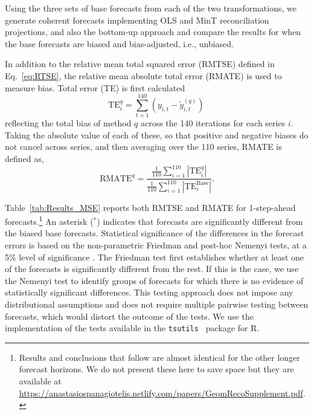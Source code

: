 \documentclass[12pt]{article}
\theoremstyle{definition}
\begin{document}
Using the three sets of base forecasts from each of the two transformations, we generate coherent forecasts implementing OLS and MinT reconciliation projections, and also the bottom-up approach and compare the results for when the base forecasts are biased and bias-adjusted, i.e., unbiased. {\color{blue} In addition to the relative mean total squared error (RMTSE) defined in Eq.~\eqref{eq:RTSE}, the relative mean absolute total error (RMATE) is used to measure bias. Total error (TE) is first calculated
\begin{equation*}
\textrm{TE}^{q}_i=\sum\limits_{t=1}^{140}(y_{i,t}-\tilde{y}^{(q)}_{i,t})\,
\end{equation*}
reflecting the total bias of method $q$ across the 140 iterations for each series $i$. Taking the absolute value of each of these, so that positive and negative biases do not cancel across series, and then averaging over the 110 series, RMATE is defined as,
\begin{equation*}
\textrm{RMATE}^{q}=\frac{\frac{1}{110}\sum\limits_{i=1}^{110}|\textrm{TE}^{q}_i|}{\frac{1}{110}\sum\limits_{i=1}^{110}|\textrm{TE}^{\textrm{Base}}_i|} . \end{equation*}

Table~\ref{tab:Results_MSE} reports both RMTSE and RMATE for 1-step-ahead forecasts.\footnote{{\color{blue} Results and conclusions that follow are almost identical for the other longer forecast horizons. We do not present these here to save space but they are available at \url{https://anastasiospanagiotelis.netlify.com/papers/GeomRecoSupplement.pdf}.}}  An asterisk ($^\ast$) indicates that forecasts are significantly different from the biased base forecasts. Statistical significance of the differences in the forecast errors is based on the non-parametric Friedman and post-hoc Nemenyi tests, at a 5\% level of significance \citep{HolEtAl2013}. The Friedman test first establishes whether at least one of the forecasts is significantly different from the rest. If this is the case, we use the Nemenyi test to identify groups of forecasts for which there is no evidence of statistically significant differences. This testing approach does not impose any distributional assumptions and does not require multiple pairwise testing between forecasts, which would distort the outcome of the tests. We use the implementation of the tests available in the \verb"tsutils " \citep{tsutils} package for R.}
\end{document}

